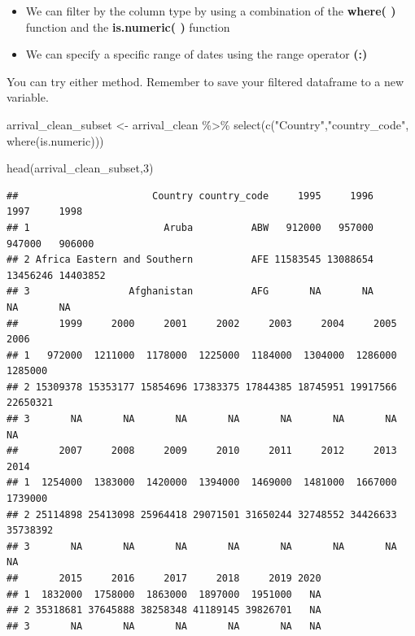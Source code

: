 \documentclass[
]{book}
\newenvironment{Shaded}{\begin{snugshade}}{\end{snugshade}}
\newcommand{\DecValTok}[1]{\textcolor[rgb]{0.00,0.00,0.81}{#1}}
\newcommand{\FunctionTok}[1]{\textcolor[rgb]{0.00,0.00,0.00}{#1}}
\newcommand{\NormalTok}[1]{#1}
\newcommand{\OtherTok}[1]{\textcolor[rgb]{0.56,0.35,0.01}{#1}}
\newcommand{\SpecialCharTok}[1]{\textcolor[rgb]{0.00,0.00,0.00}{#1}}
\newcommand{\StringTok}[1]{\textcolor[rgb]{0.31,0.60,0.02}{#1}}
\begin{document}
\begin{itemize}
\item
  We can filter by the column type by using a combination of the \textbf{where( )} function and the \textbf{is.numeric( )} function
\item
  We can specify a specific range of dates using the range operator \textbf{(:)}
\end{itemize}

You can try either method. Remember to save your filtered dataframe to a new variable.

\begin{Shaded}
\begin{Highlighting}[]
\NormalTok{arrival\_clean\_subset }\OtherTok{\textless{}{-}}\NormalTok{ arrival\_clean }\SpecialCharTok{\%\textgreater{}\%}
  \FunctionTok{select}\NormalTok{(}\FunctionTok{c}\NormalTok{(}\StringTok{"Country"}\NormalTok{,}\StringTok{"country\_code"}\NormalTok{, }\FunctionTok{where}\NormalTok{(is.numeric)))}

\FunctionTok{head}\NormalTok{(arrival\_clean\_subset,}\DecValTok{3}\NormalTok{)}
\end{Highlighting}
\end{Shaded}

\begin{verbatim}
##                       Country country_code     1995     1996     1997     1998
## 1                       Aruba          ABW   912000   957000   947000   906000
## 2 Africa Eastern and Southern          AFE 11583545 13088654 13456246 14403852
## 3                 Afghanistan          AFG       NA       NA       NA       NA
##       1999     2000     2001     2002     2003     2004     2005     2006
## 1   972000  1211000  1178000  1225000  1184000  1304000  1286000  1285000
## 2 15309378 15353177 15854696 17383375 17844385 18745951 19917566 22650321
## 3       NA       NA       NA       NA       NA       NA       NA       NA
##       2007     2008     2009     2010     2011     2012     2013     2014
## 1  1254000  1383000  1420000  1394000  1469000  1481000  1667000  1739000
## 2 25114898 25413098 25964418 29071501 31650244 32748552 34426633 35738392
## 3       NA       NA       NA       NA       NA       NA       NA       NA
##       2015     2016     2017     2018     2019 2020
## 1  1832000  1758000  1863000  1897000  1951000   NA
## 2 35318681 37645888 38258348 41189145 39826701   NA
## 3       NA       NA       NA       NA       NA   NA
\end{verbatim}
\end{document}
